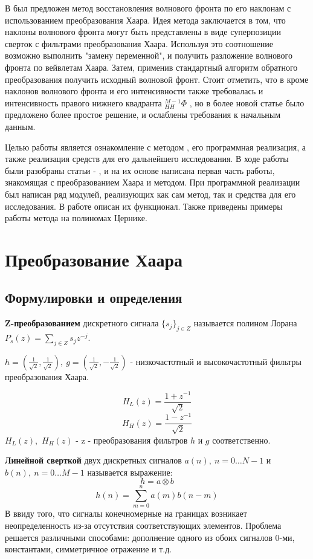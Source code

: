 \documentclass[oneside, final, 14pt]{article}
\begin{document}
В \cite{new_method1} был предложен метод восстановления волнового фронта по его наклонам с использованием преобразования Хаара. Идея метода заключается в том, что наклоны волнового фронта могут быть представлены в виде суперпозиции сверток с фильтрами преобразования Хаара. Используя это соотношение возможно выполнить "замену переменной", и получить разложение волнового фронта по вейвлетам Хаара. Затем, применив стандартный алгоритм обратного преобразования получить исходный волновой фронт. Стоит отметить, что в \cite{new_method1} кроме наклонов волнового фронта и его интенсивности также требовалась и интенсивность правого нижнего квадранта $_{HH}^{M-1}\Phi$ , но в более новой статье \cite{new_method2} было предложено более простое решение, и ослаблены требования к начальным данным. 

Целью работы является ознакомление с методом , его программная реализация, а также реализация средств для его дальнейшего исследования. В ходе работы были разобраны статьи \cite{new_method1}- \cite{new_method2}, и на их основе написана первая часть работы, знакомящая с преобразованием Хаара и методом. При программной реализации был написан ряд модулей, реализующих как сам метод, так и средства для его исследования. В работе описан их функционал. Также приведены примеры работы метода на полиномах Цернике.
\newpage
\section{Преобразование Хаара} 
\subsection{Формулировки и определения}
\textbf{Z-преобразованием} дискретного сигнала $\{s_j\}_{ j \in Z}$ называется полином Лорана 
$P_{s}(z) = \sum_{j \in Z} s_{j}z^{-j}$.

$h = (\frac{1}{\sqrt{2}}, \frac{1}{\sqrt{2}}),~g = (\frac{1}{\sqrt{2}}, -\frac{1}{\sqrt{2}})$ - низкочастотный и высокочастотный фильтры преобразования Хаара.

$$ H_{L}(z) = \frac{1 + z^{-1}}{\sqrt{2}} $$
$$ H_{H}(z) = \frac{1 - z^{-1}}{\sqrt{2}} $$
$H_{L}(z)$,~$H_{H}(z)$ - z - преобразования фильтров $h$ и $g$ соответственно.

\textbf{Линейной сверткой} двух дискретных сигналов $a(n),~ n=0 \ldots N-1$ и $b(n),~ n=0 \ldots M-1$ называется выражение:
$$ h = a \otimes b $$
$$ h(n) =  \sum_{m=0}^{n} a(m)b(n-m) $$
В ввиду того, что сигналы конечномерные на границах возникает неопределенность из-за отсутствия соответствующих элементов. Проблема решается различными способами: дополнение одного из обоих сигналов $0$-ми, константами, симметричное отражение и т.д.
\end{document}
